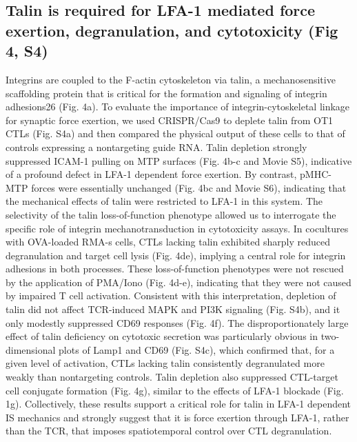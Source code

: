 \subsection{Talin is required for LFA-1 mediated force exertion, degranulation, and cytotoxicity (Fig 4, S4)}
Integrins are coupled to the F-actin cytoskeleton via talin, a mechanosensitive scaffolding protein that is critical for the formation and signaling of integrin adhesions26 (Fig. 4a). To evaluate the importance of integrin-cytoskeletal linkage for synaptic force exertion, we used CRISPR/Cas9 to deplete talin from OT1 CTLs (Fig. S4a) and then compared the physical output of these cells to that of controls expressing a nontargeting guide RNA. Talin depletion strongly suppressed ICAM-1 pulling on MTP surfaces (Fig. 4b-c and Movie S5), indicative of a profound defect in LFA-1 dependent force exertion. By contrast, pMHC-MTP forces were essentially unchanged (Fig. 4bc and Movie S6), indicating that the mechanical effects of talin were restricted to LFA-1 in this system. The selectivity of the talin loss-of-function phenotype allowed us to interrogate the specific role of integrin mechanotransduction in cytotoxicity assays. In cocultures with OVA-loaded RMA-s cells, CTLs lacking talin exhibited sharply reduced degranulation and target cell lysis (Fig. 4de), implying a central role for integrin adhesions in both processes. These loss-of-function phenotypes were not rescued by the application of PMA/Iono (Fig. 4d-e), indicating that they were not caused by impaired T cell activation. Consistent with this interpretation, depletion of talin did not affect TCR-induced MAPK and PI3K signaling (Fig. S4b), and it only modestly suppressed CD69 responses (Fig. 4f). The disproportionately large effect of talin deficiency on cytotoxic secretion was particularly obvious in two-dimensional plots of Lamp1 and CD69 (Fig. S4c), which confirmed that, for a given level of activation, CTLs lacking talin consistently degranulated more weakly than nontargeting controls. Talin depletion also suppressed CTL-target cell conjugate formation (Fig. 4g), similar to the effects of LFA-1 blockade (Fig. 1g). Collectively, these results support a critical role for talin in LFA-1 dependent IS mechanics and strongly suggest that it is force exertion through LFA-1, rather than the TCR, that imposes spatiotemporal control over CTL degranulation.

